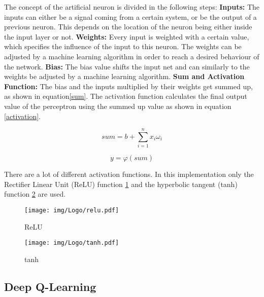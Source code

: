 The concept of the artificial neuron is divided in the following steps: \newline
\textbf{Inputs:} \newline
The inputs can either be a signal coming from a certain system, or be the output of a previous neuron. This depends on the location of the neuron being either inside the input layer or not. \newline
\textbf{Weights:} \newline
Every input is weighted with a certain value, which specifies the influence of the input to this neuron. The weights can be adjusted by a machine learning algorithm in order to reach a desired behaviour of the network. \newline
\textbf{Bias:} \newline
The bias value shifts the input net and can similarly to the weights be adjusted by a machine learning algorithm. \newline
\textbf{Sum and Activation Function:} \newline
The bias and the inputs multiplied by their weights get summed up, as shown in equation\ref{sum}. The activation function calculates the final output value of the perceptron using the summed up value as shown in equation \ref{activation}.  \newline

\begin{equation}
	sum = b + \sum_{i = 1}^n x_i \omega_i
	\label{sum}
\end{equation}

\begin{equation}
	y = \varphi(sum)
	\label{activation}
\end{equation}

There are a lot of different activation functions. In this implementation only the Rectifier Linear Unit (ReLU) function \ref{fig:relu} and the hyperbolic tangent (tanh) function \ref{fig:tanh} are used.

\begin{figure} 
	\centering
	\texttt{[image: img/Logo/relu.pdf]}
	\caption{ReLU}
	\label{fig:relu}
\end{figure}

\begin{figure} 
	\centering
	\texttt{[image: img/Logo/tanh.pdf]}
	\caption{tanh}
	\label{fig:tanh}
\end{figure}

\subsection{Deep Q-Learning}
